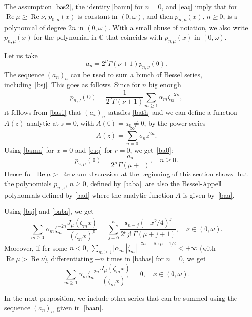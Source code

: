 \documentclass[12pt,leqno]{amsart}
\numberwithin{equation}{section}
\theoremstyle{plain}
\newcommand{\CC}{\mathbb{C}}
\renewcommand{\Re}{\operatorname{Re}}
\begin{document}
The assumption \eqref{bas2}, the identity \eqref{bamn} for $n=0$, and \eqref{eaq} imply that for $\Re \mu\ge \Re \nu$, $p_{0,\mu}(x)$ is constant in $(0,\omega)$, and then $p_{n,\mu}(x)$, $n\ge 0$, is a polynomial of degree $2n$ in $(0,\omega)$. With a small abuse of notation, we also write $p_{n,\mu}(x)$ for the polynomial in $\CC$ that coincides with $p_{n,\mu}(x)$ in $(0,\omega)$.

Let us take
\begin{equation}
\label{baan}
a_n = 2^\nu\Gamma(\nu+1)p_{n,\nu}(0).
\end{equation}
The sequence $(a_n)_n$ can be used to sum a bunch of Bessel series, including~\eqref{bsj}. This goes as follows. Since for $n$ big enough
\[
p_{n,\nu}(0) = \frac{1}{2^\nu\Gamma(\nu+1)} \sum_{m\ge 1}\alpha_m\zeta_m^{-2n},
\]
it follows from \eqref{bas1} that $(a_n)_n$ satisfies \eqref{bath} and we can define a function $A(z)$ analytic at $z=0$, with $A(0)=a_0\not =0$, by the power series
\begin{equation}
\label{baa}
A(z) = \sum_{n=0}^\infty a_nz^{2n}.
\end{equation}
Using \eqref{bamn} for $x=0$ and \eqref{eaq} for $r=0$, we get~\eqref{ba0}:
\begin{equation*}
p_{n,\mu}(0)=\frac{a_n}{2^\mu\Gamma(\mu+1)},\quad n\ge 0.
\end{equation*}
Hence for $\Re \mu>\Re \nu $ our discussion at the beginning of this section shows that the polynomials $p_{n,\mu}$, $n\ge 0$, defined by \eqref{baba}, are also the Bessel-Appell polynomials defined by \eqref{bad} where the analytic function $A$ is given by~\eqref{baa}.

Using \eqref{baj} and \eqref{baba}, we get
\begin{equation}
\label{babas}
\sum_{m\ge 1} \alpha_m\zeta_m^{-2n} \frac{J_{\mu}(\zeta_m x)}{(\zeta_m x)^\mu}
= \sum_{j=0}^n\frac{a_{n-j}(-x^2/4)^{j}}{2^{\mu}j!\,\Gamma(\mu+j+1)}, \quad x\in (0,\omega).
\end{equation}
Moreover, if for some $n<0$, $ \sum_{m\ge 1} |\alpha_m| |\zeta_m|^{-2n-\Re \mu -1/2} < +\infty$ (with $\Re \mu>\Re \nu$), differentiating $-n$ times in \eqref{babas} for $n=0$, we get
\begin{equation*}
\sum_{m\ge 1} \alpha_m\zeta_m^{-2n} \frac{J_{\mu}(\zeta_m x)}{(\zeta_m x)^\mu} = 0, 
\quad x\in (0,\omega).
\end{equation*}

In the next proposition, we include other series that can be summed using the sequence $(a_n)_n$ given in~\eqref{baan}.
\end{document}
